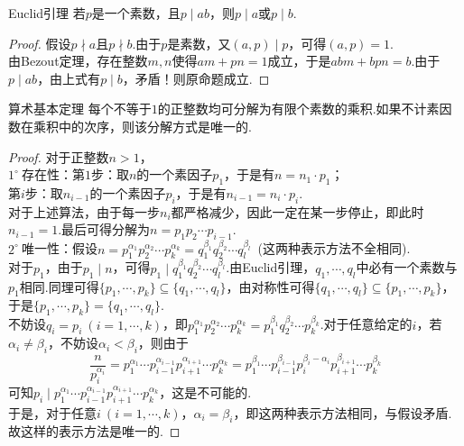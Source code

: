 \documentclass[lang=cn, zihao=5]{elegantbook}
\newcommand{\buzhou}[1]{$#1^{\circ} \ $}
\begin{document}
\begin{theorem}{Euclid引理}
	若$p$是一个素数，且$p \mid ab$，则$p \mid a$或$p \mid b$.
\end{theorem}
\begin{proof}
	假设$p \nmid a$且$p \nmid b$.由于$p$是素数，又$(a,p) \mid p$，可得$(a,p)=1$. \\
	由Bezout定理，存在整数$m,n$使得$am+pn=1$成立，于是$abm+bpn=b$.由于$p \mid ab$，由上式有$p \mid b$，矛盾！则原命题成立.
\end{proof}

\begin{theorem}{算术基本定理}
	每个不等于$1$的正整数均可分解为有限个素数的乘积.如果不计素因数在乘积中的次序，则该分解方式是唯一的.
\end{theorem}
\begin{proof}
	对于正整数$n>1$， \\
	\buzhou{1}存在性：第$1$步：取$n$的一个素因子$p_1$，于是有$n=n_1 \cdot p_1$； \\
	第$i$步：取$n_{i-1}$的一个素因子$p_i$，于是有$n_{i-1}=n_i \cdot p_i$. \\
	对于上述算法，由于每一步$n_i$都严格减少，因此一定在某一步停止，即此时$n_{i-1}=1$.最后可得分解为$n=p_1p_2 \cdots p_{i-1}$. \\
	\buzhou{2}唯一性：假设$n = p_1^{\alpha _1} p_2^{\alpha _2} \cdots p_k^{\alpha _k} = q_1^{\beta _1} q_2^{\beta _2} \cdots q_l^{\beta _l}$~(这两种表示方法不全相同). \\
	对于$p_1$，由于$p_1 \mid n$，可得$p_1 \mid q_1^{\beta _1} q_2^{\beta _2} \cdots q_l^{\beta _l}$.由Euclid引理，$q_1, \cdots ,q_l$中必有一个素数与$p_1$相同.同理可得$\{ p_1,\cdots ,p_k \} \subseteq \{ q_1,\cdots ,q_l \}$，由对称性可得$\{ q_1,\cdots ,q_l \} \subseteq \{ p_1,\cdots ,p_k \}$，于是$\{ p_1,\cdots ,p_k \} = \{ q_1,\cdots ,q_l \}$. \\
	不妨设$q_i=p_i~(i=1, \cdots ,k)$，即$p_1^{\alpha _1} p_2^{\alpha _2} \cdots p_k^{\alpha _k} = p_1^{\beta _1} q_2^{\beta _2} \cdots p_k^{\beta _k}$.对于任意给定的$i$，若$\alpha _i \neq \beta _i$，不妨设$\alpha _i < \beta _i$，则由于$$\frac{n}{p_i^{\alpha _i}} = p_1^{\alpha _1} \cdots p_{i-1}^{\alpha _{i-1}} p_{i+1}^{\alpha _{i+1}} \cdots p_{k}^{\alpha _{k}} = p_1^{\beta _1} \cdots p_{i-1}^{\beta _{i-1}} p_{i}^{\beta _{i} - \alpha _{i}} p_{i+1}^{\beta _{i+1}} \cdots p_{k}^{\beta _{k}}$$
	可知$p_i \mid p_1^{\alpha _1} \cdots p_{i-1}^{\alpha _{i-1}} p_{i+1}^{\alpha _{i+1}} \cdots p_{k}^{\alpha _{k}}$，这是不可能的. \\
	于是，对于任意$i~(i=1, \cdots ,k)$，$\alpha _i = \beta _i$，即这两种表示方法相同，与假设矛盾.故这样的表示方法是唯一的.
\end{proof}
\end{document}

